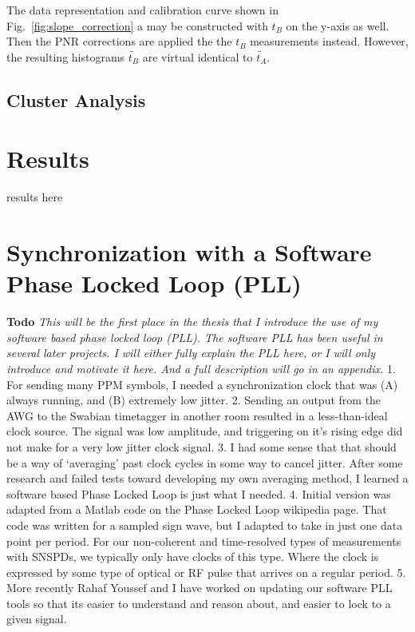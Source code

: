 \documentclass[11pt]{caltech_thesis} %
\begin{document}
The data representation and calibration curve shown in Fig.~\ref{fig:slope_correction} a may be constructed with $t_B$ on the y-axis as well. Then the PNR corrections are applied the the $t_B$ measurements instead. However, the resulting histograms $\tilde{t_B}$ are virtual identical to $\tilde{t_A}$.

\hypertarget{cluster-analysis}{%
\subsection{Cluster Analysis}\label{cluster-analysis}}

\hypertarget{results}{%
\section{Results}\label{results}}

results here

{}

\hypertarget{synchronization-with-a-software-phase-locked-loop-pll}{%
\section{Synchronization with a Software Phase Locked Loop (PLL)}\label{synchronization-with-a-software-phase-locked-loop-pll}}

\textbf{Todo}
\emph{This will be the first place in the thesis that I introduce the use of my software based phase locked loop (PLL). The software PLL has been useful in several later projects. I will either fully explain the PLL here, or I will only introduce and motivate it here. And a full description will go in an appendix. }
1. For sending many PPM symbols, I needed a synchronization clock that was (A) always running, and (B) extremely low jitter.
2. Sending an output from the AWG to the Swabian timetagger in another room resulted in a less-than-ideal clock source. The signal was low amplitude, and triggering on it's rising edge did not make for a very low jitter clock signal.
3. I had some sense that that should be a way of `averaging' past clock cycles in some way to cancel jitter. After some research and failed tests toward developing my own averaging method, I learned a software based Phase Locked Loop is just what I needed.
4. Initial version was adapted from a Matlab code on the Phase Locked Loop wikipedia page. That code was written for a sampled sign wave, but I adapted to take in just one data point per period. For our non-coherent and time-resolved types of measurements with SNSPDs, we typically only have clocks of this type. Where the clock is expressed by some type of optical or RF pulse that arrives on a regular period.
5. More recently Rahaf Youssef and I have worked on updating our software PLL tools so that its easier to understand and reason about, and easier to lock to a given signal.
\end{document}
